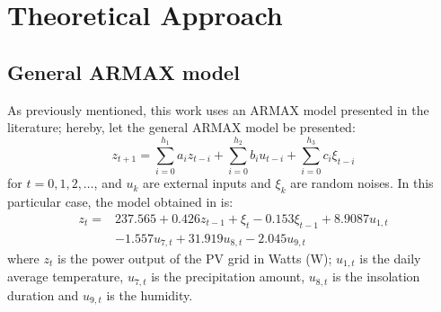 \section{Theoretical Approach}\label{sec:theo}
\subsection{General ARMAX model}

As previously mentioned, this work uses an ARMAX model presented in the literature; hereby, let the general ARMAX model be presented:
\begin{equation}
    z_{t+1}=\sum_{i=0}^{h_1}a_iz_{t-i}+\sum_{i=0}^{h_2}b_iu_{t-i}+\sum_{i=0}^{h_3}c_i\xi_{t-i}
\end{equation}
for $t=0,1,2,\ldots$, and $u_k$ are external inputs and $\xi_k$ are random noises. In this particular case, the model obtained in \cite{li2014armax} is:
\begin{equation}
\begin{aligned} z_{t}=& 237.565+0.426z_{t-1}+\xi_{t}-0.153 \xi_{t-1}+8.9087u_{1, t} \\ &-1.557 u_{7, t}+31.919 u_{8, t}-2.045u_{9, t}
\end{aligned}
\end{equation}
where $z_t$ is the power output of the PV grid in Watts (W); $u_{1,t}$ is the daily average temperature, $u_{7,t}$ is the precipitation amount, $u_{8,t}$ is the insolation duration and $u_{9,t}$ is the humidity.

